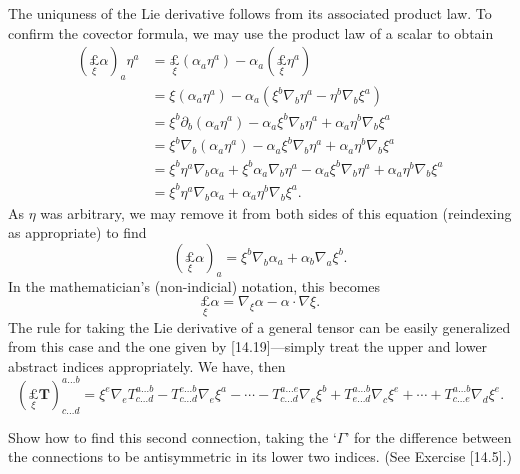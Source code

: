 \documentclass[../the-road-to-reality.tex]{subfiles}
\begin{document}
\begin{questions}
    \begin{solution}
      The uniquness of the Lie derivative follows from its associated product
      law. To confirm the covector formula, we may use the product law of a
      scalar to obtain
      \begin{align*}
        (\underset{\xi}{\pounds}\alpha)_a\eta^a &= \underset{\xi}{\pounds}(\alpha_a\eta^a) - \alpha_a(\underset{\xi}{\pounds}\eta^a) \\
                                                &= \xi(\alpha_a\eta^a) - \alpha_a(\xi^b\nabla_b\eta^a - \eta^b\nabla_b\xi^a) \\
                                                &= \xi^b\partial_b(\alpha_a\eta^a) - \alpha_a\xi^b\nabla_b\eta^a + \alpha_a\eta^b\nabla_b\xi^a \\
                                                &= \xi^b\nabla_b(\alpha_a\eta^a) - \alpha_a\xi^b\nabla_b\eta^a + \alpha_a\eta^b\nabla_b\xi^a \\
                                                &= \xi^b\eta^a\nabla_b\alpha_a + \xi^b\alpha_a\nabla_b\eta^a - \alpha_a\xi^b\nabla_b\eta^a + \alpha_a\eta^b\nabla_b\xi^a \\
        &= \xi^b\eta^a\nabla_b\alpha_a + \alpha_a\eta^b\nabla_b\xi^a.
      \end{align*}
      As $\eta$ was arbitrary, we may remove it from both sides of this equation
      (reindexing as appropriate) to find
      \[
        (\underset{\xi}{\pounds}\alpha)_a = \xi^b\nabla_b\alpha_a + \alpha_b\nabla_a\xi^b.
      \]
      In the mathematician's (non-indicial) notation, this becomes
      \[
        \underset{\xi}{\pounds}\alpha = \nabla_\xi\alpha - \alpha\cdot\nabla\xi.
      \]
      The rule for taking the Lie derivative of a general tensor can be easily
      generalized from this case and the one given by [14.19]---simply treat the
      upper and lower abstract indices appropriately. We have, then
      \[
        (\underset{\xi}{\pounds}\mathbf{T})^{a\dots{b}}_{c\dots{d}} =
        \xi^e\nabla_eT^{a\dots{b}}_{c\dots{d}} -
        T^{e\dots{b}}_{c\dots{d}}\nabla_e\xi^a - \cdots - 
        T^{a\dots{e}}_{c\dots{d}}\nabla_e\xi^b +
        T^{a\dots{b}}_{e\dots{d}}\nabla_c\xi^e + \cdots + T^{a\dots{b}}_{c\dots{e}}\nabla_d\xi^e.
      \]
    \end{solution}

\question Show how to find this second connection, taking the `$\Gamma$' for the
  difference between the connections to be antisymmetric in its lower two
  indices. (See Exercise [14.5].)


\end{questions}
\end{document}
